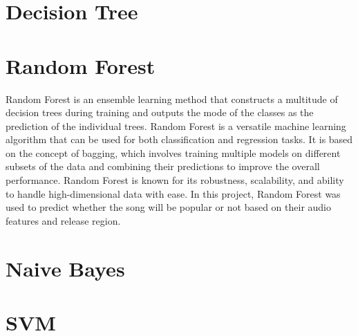 \section{Decision Tree}




\section{Random Forest}
Random Forest is an ensemble learning method that constructs a multitude of decision trees during
training and outputs the mode of the classes as the prediction of the individual trees. Random Forest
is a versatile machine learning algorithm that can be used for both classification and regression
tasks. It is based on the concept of bagging, which involves training multiple models on different
subsets of the data and combining their predictions to improve the overall performance. Random Forest
is known for its robustness, scalability, and ability to handle high-dimensional data with ease.
In this project, Random Forest was used to predict whether the song will be popular or not based on their audio
features and release region. \\





\section{Naive Bayes}

\section{SVM}